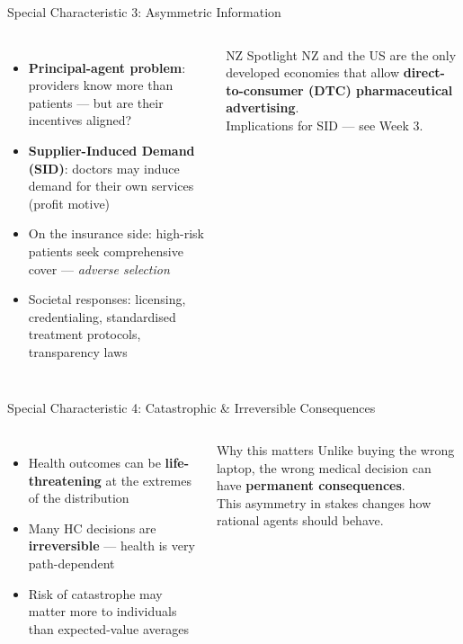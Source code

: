 \documentclass[aspectratio=169, 12pt]{beamer}
\begin{document}
\begin{frame}{Special Characteristic 3: Asymmetric Information}
	\begin{columns}
		{\small\begin{itemize}\setlength{\itemsep}{0.2em}
			\item \textbf{Principal-agent problem}: providers know more than patients --- but are their incentives aligned?
			\item \textbf{Supplier-Induced Demand (SID)}: doctors may induce demand for their own services (profit motive)
			\item On the insurance side: high-risk patients seek comprehensive cover --- \textit{adverse selection}
			\item Societal responses: licensing, credentialing, standardised treatment protocols, transparency laws
		\end{itemize}}
		\begin{exampleblock}{NZ Spotlight}
			{\small NZ and the US are the only developed economies that allow \textbf{direct-to-consumer (DTC) pharmaceutical advertising}.\\[0.3em]
			Implications for SID --- see Week 3.}
		\end{exampleblock}
	\end{columns}
\end{frame}

\begin{frame}{Special Characteristic 4: Catastrophic \& Irreversible Consequences}
	\begin{columns}
		\column{0.55\textwidth}
		\begin{itemize}
			\item Health outcomes can be \textbf{life-threatening} at the extremes of the distribution
			\item Many HC decisions are \textbf{irreversible} --- health is very path-dependent
			\item Risk of catastrophe may matter more to individuals than expected-value averages
		\end{itemize}
		\column{0.42\textwidth}
		\begin{alertblock}{Why this matters}
			Unlike buying the wrong laptop, the wrong medical decision can have \textbf{permanent consequences}.\\[0.4em]
			This asymmetry in stakes changes how rational agents should behave.
		\end{alertblock}
	\end{columns}
\end{frame}
\end{document}
